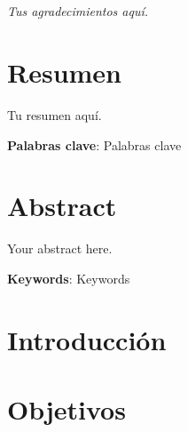 \documentclass[a4paper]{report}
\newcommand\paginablanco{%
    \null
    \thispagestyle{empty}%
    \newpage}
\begin{document}




\chapter*{}
\thispagestyle{empty}
\begin{flushright}
\textit{Tus agradecimientos aquí.}

\end{flushright}

\thispagestyle{empty}
\chapter*{Resumen} %

Tu resumen aquí. \newline


\textbf{Palabras clave}: Palabras clave


\thispagestyle{empty}
\chapter*{Abstract} %

Your abstract here. \newline

\textbf{Keywords}: Keywords

\pagestyle{short}
\tableofcontents
\newpage
\listoftables %
\newpage
\listoffigures
\newpage
\lstlistoflistings
\newpage

\paginablanco{}

\pagestyle{long}

\chapter{Introducción}

\newpage

\chapter{Objetivos}

\newpage
\end{document}
